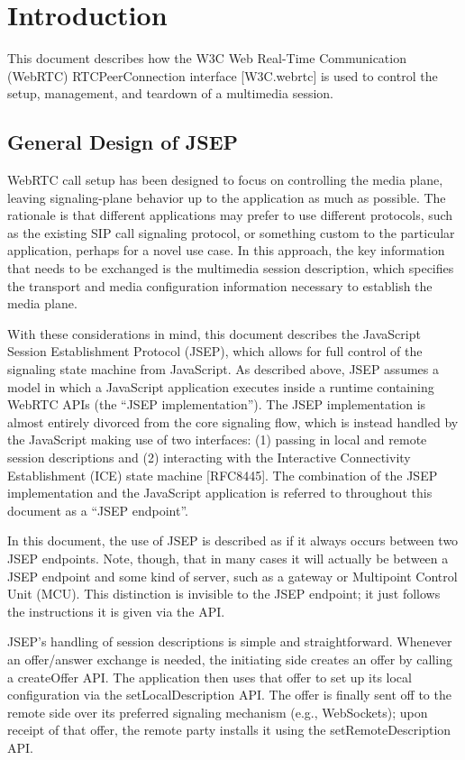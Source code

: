 \documentclass{article}
\begin{document}
\section{Introduction}

This document describes how the W3C Web Real-Time Communication
(WebRTC) RTCPeerConnection interface [W3C.webrtc] is used to control
the setup, management, and teardown of a multimedia session.

\subsection{General Design of JSEP}

WebRTC call setup has been designed to focus on controlling the media
plane, leaving signaling-plane behavior up to the application as much
as possible.  The rationale is that different applications may prefer
to use different protocols, such as the existing SIP call signaling
protocol, or something custom to the particular application, perhaps
for a novel use case.  In this approach, the key information that
needs to be exchanged is the multimedia session description, which
specifies the transport and media configuration information necessary
to establish the media plane.

With these considerations in mind, this document describes the
JavaScript Session Establishment Protocol (JSEP), which allows for
full control of the signaling state machine from JavaScript.  As
described above, JSEP assumes a model in which a JavaScript
application executes inside a runtime containing WebRTC APIs (the
``JSEP implementation'').  The JSEP implementation is almost entirely
divorced from the core signaling flow, which is instead handled by
the JavaScript making use of two interfaces: (1) passing in local and
remote session descriptions and (2) interacting with the Interactive
Connectivity Establishment (ICE) state machine [RFC8445].  The
combination of the JSEP implementation and the JavaScript application
is referred to throughout this document as a ``JSEP endpoint''.

In this document, the use of JSEP is described as if it always occurs
between two JSEP endpoints.  Note, though, that in many cases it will
actually be between a JSEP endpoint and some kind of server, such as
a gateway or Multipoint Control Unit (MCU).  This distinction is
invisible to the JSEP endpoint; it just follows the instructions it
is given via the API.

JSEP's handling of session descriptions is simple and
straightforward.  Whenever an offer/answer exchange is needed, the
initiating side creates an offer by calling a createOffer API.  The
application then uses that offer to set up its local configuration
via the setLocalDescription API.  The offer is finally sent off to
the remote side over its preferred signaling mechanism (e.g.,
WebSockets); upon receipt of that offer, the remote party installs it
using the setRemoteDescription API.
\end{document}
